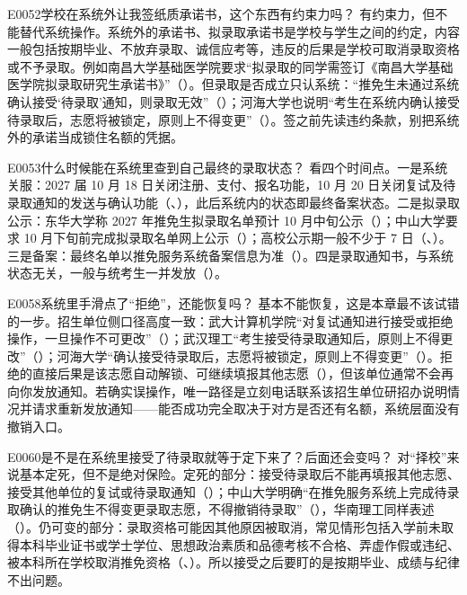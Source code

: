\begin{qa}{E0052}{学校在系统外让我签纸质承诺书，这个东西有约束力吗？}
有约束力，但不能替代系统操作。系统外的承诺书、拟录取承诺书是学校与学生之间的约定，内容一般包括按期毕业、不放弃录取、诚信应考等，违反的后果是学校可取消录取资格或不予录取。例如南昌大学基础医学院要求“拟录取的同学需签订《南昌大学基础医学院拟录取研究生承诺书》”（）。但录取是否成立只认系统：“推免生未通过系统确认接受‘待录取’通知，则录取无效”（）；河海大学也说明“考生在系统内确认接受待录取后，志愿将被锁定，原则上不得变更”（）。签之前先读违约条款，别把系统外的承诺当成锁住名额的凭据。
\end{qa}

\begin{qa}{E0053}{什么时候能在系统里查到自己最终的录取状态？}
看四个时间点。一是系统关服：2027 届 10 月 18 日关闭注册、支付、报名功能，10 月 20 日关闭复试及待录取通知的发送与确认功能（、），此后系统内的状态即最终备案状态。二是拟录取公示：东华大学称 2027 年推免生拟录取名单预计 10 月中旬公示（）；中山大学要求 10 月下旬前完成拟录取名单网上公示（）；高校公示期一般不少于 7 日（、）。三是备案：最终名单以推免服务系统备案信息为准（）。四是录取通知书，与系统状态无关，一般与统考生一并发放（）。
\end{qa}

\begin{qa}{E0058}{系统里手滑点了“拒绝”，还能恢复吗？}
基本不能恢复，这是本章最不该试错的一步。招生单位侧口径高度一致：武大计算机学院“对复试通知进行接受或拒绝操作，一旦操作不可更改”（）；武汉理工“考生接受待录取通知后，原则上不得更改”（）；河海大学“确认接受待录取后，志愿将被锁定，原则上不得变更”（）。拒绝的直接后果是该志愿自动解锁、可继续填报其他志愿（），但该单位通常不会再向你发放通知。若确实误操作，唯一路径是立刻电话联系该招生单位研招办说明情况并请求重新发放通知——能否成功完全取决于对方是否还有名额，系统层面没有撤销入口。
\end{qa}

\begin{qa}{E0060}{是不是在系统里接受了待录取就等于定下来了？后面还会变吗？}
对“择校”来说基本定死，但不是绝对保险。定死的部分：接受待录取后不能再填报其他志愿、接受其他单位的复试或待录取通知（）；中山大学明确“在推免服务系统上完成待录取确认的推免生不得变更录取志愿，不得撤销待录取”（），华南理工同样表述（）。仍可变的部分：录取资格可能因其他原因被取消，常见情形包括入学前未取得本科毕业证书或学士学位、思想政治素质和品德考核不合格、弄虚作假或违纪、被本科所在学校取消推免资格（、）。所以接受之后要盯的是按期毕业、成绩与纪律不出问题。
\end{qa}

